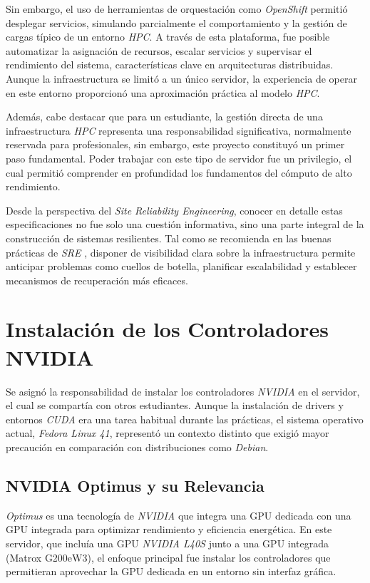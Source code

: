 Sin embargo, el uso de herramientas de orquestación como \textit{OpenShift} permitió desplegar servicios, simulando parcialmente el comportamiento y la gestión de cargas típico de un entorno \textit{HPC}. A través de esta plataforma, fue posible automatizar la asignación de recursos, escalar servicios y supervisar el rendimiento del sistema, características clave en arquitecturas distribuidas. Aunque la infraestructura se limitó a un único servidor, la experiencia de operar en este entorno proporcionó una aproximación práctica al modelo \textit{HPC}.

Además, cabe destacar que para un estudiante, la gestión directa de una infraestructura \textit{HPC} representa una responsabilidad significativa, normalmente reservada para profesionales, sin embargo, este proyecto constituyó un primer paso fundamental. Poder trabajar con este tipo de servidor fue un privilegio, el cual permitió comprender en profundidad los fundamentos del cómputo de alto rendimiento.

Desde la perspectiva del \textit{Site Reliability Engineering}, conocer en detalle estas especificaciones no fue solo una cuestión informativa, sino una parte integral de la construcción de sistemas resilientes. Tal como se recomienda en las buenas prácticas de \textit{SRE} \Cite{ref6}, disponer de visibilidad clara sobre la infraestructura permite anticipar problemas como cuellos de botella, planificar escalabilidad y establecer mecanismos de recuperación más eficaces.



\newpage
\section{Instalación de los Controladores NVIDIA}
Se asignó la responsabilidad de instalar los controladores \textit{NVIDIA} en el servidor, el cual se compartía con otros estudiantes. Aunque la instalación de drivers y entornos \textit{CUDA} era una tarea habitual durante las prácticas, el sistema operativo actual, \textit{Fedora Linux 41}, representó un contexto distinto que exigió mayor precaución en comparación con distribuciones como \textit{Debian}.~\cite{ref25}

\subsection*{NVIDIA Optimus y su Relevancia}
\textit{Optimus} \cite{ref74} es una tecnología de \textit{NVIDIA} que integra una GPU dedicada con una GPU integrada para optimizar rendimiento y eficiencia energética. En este servidor, que incluía una GPU \textit{NVIDIA L40S} junto a una GPU integrada (Matrox G200eW3), el enfoque principal fue instalar los controladores que permitieran aprovechar la GPU dedicada en un entorno sin interfaz gráfica.~\cite{ref22}

